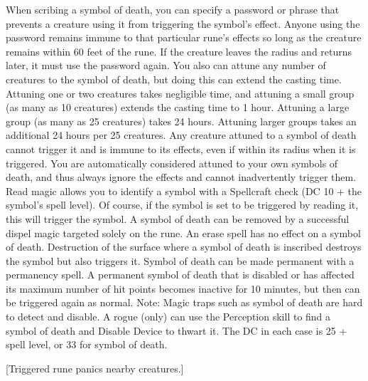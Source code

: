 {When scribing a symbol of death, you can specify a password or phrase that prevents a creature using it from triggering the symbol's effect. Anyone using the password remains immune to that particular rune's effects so long as the creature remains within 60 feet of the rune. If the creature leaves the radius and returns later, it must use the password again.
You also can attune any number of creatures to the symbol of death, but doing this can extend the casting time. Attuning one or two creatures takes negligible time, and attuning a small group (as many as 10 creatures) extends the casting time to 1 hour. Attuning a large group (as many as 25 creatures) takes 24 hours. Attuning larger groups takes an additional 24 hours per 25 creatures. Any creature attuned to a symbol of death cannot trigger it and is immune to its effects, even if within its radius when it is triggered. You are automatically considered attuned to your own symbols of death, and thus always ignore the effects and cannot inadvertently trigger them.
Read magic allows you to identify a symbol with a Spellcraft check (DC 10 + the symbol's spell level). Of course, if the symbol is set to be triggered by reading it, this will trigger the symbol.
A symbol of death can be removed by a successful dispel magic targeted solely on the rune. An erase spell has no effect on a symbol of death. Destruction of the surface where a symbol of death is inscribed destroys the symbol but also triggers it.
Symbol of death can be made permanent with a permanency spell.
A permanent symbol of death that is disabled or has affected its maximum number of hit points becomes inactive for 10 minutes, but then can be triggered again as normal.
Note: Magic traps such as symbol of death are hard to detect and disable. A rogue (only) can use the Perception skill to find a symbol of death and Disable Device to thwart it. The DC in each case is 25 + spell level, or 33 for symbol of death.}
        
[Triggered rune panics nearby creatures.]
        
